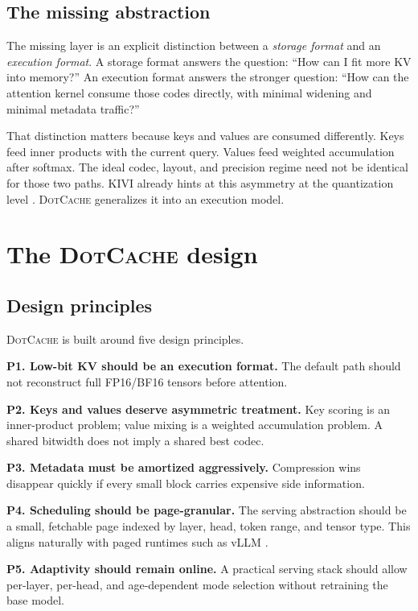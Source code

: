 \documentclass[11pt]{article}
\newcommand{\method}{\textsc{DotCache}}
\newcommand{\kv}{KV}
\begin{document}
\subsection{The missing abstraction}

The missing layer is an explicit distinction between a \emph{storage format} and an \emph{execution format}. A storage format answers the question: ``How can I fit more \kv{} into memory?'' An execution format answers the stronger question: ``How can the attention kernel consume those codes directly, with minimal widening and minimal metadata traffic?''

That distinction matters because keys and values are consumed differently. Keys feed inner products with the current query. Values feed weighted accumulation after softmax. The ideal codec, layout, and precision regime need not be identical for those two paths. KIVI already hints at this asymmetry at the quantization level \cite{kivi}. \method{} generalizes it into an execution model.

\section{The \method{} design}

\subsection{Design principles}

\method{} is built around five design principles.

\textbf{P1. Low-bit \kv{} should be an execution format.} The default path should not reconstruct full FP16/BF16 tensors before attention.

\textbf{P2. Keys and values deserve asymmetric treatment.} Key scoring is an inner-product problem; value mixing is a weighted accumulation problem. A shared bitwidth does not imply a shared best codec.

\textbf{P3. Metadata must be amortized aggressively.} Compression wins disappear quickly if every small block carries expensive side information.

\textbf{P4. Scheduling should be page-granular.} The serving abstraction should be a small, fetchable page indexed by layer, head, token range, and tensor type. This aligns naturally with paged runtimes such as vLLM \cite{pagedattention}.

\textbf{P5. Adaptivity should remain online.} A practical serving stack should allow per-layer, per-head, and age-dependent mode selection without retraining the base model.
\end{document}
